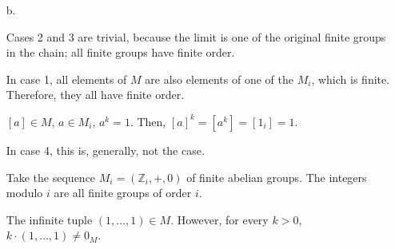 \documentclass{article}
\begin{document}
\begin{enumerate}
\begin{enumerate}
       \item[b.]

         Cases 2 and 3 are trivial, because the limit is one of the
         original finite groups in the chain; all finite groups have
         finite order.

         In case 1, all elements of $M$ are also elements of one of the
         $M_i$, which is finite. Therefore, they all have finite order.

         $[a] \in M$, $a \in M_i$, $a^k = 1$. Then, $[a]^k = \left [ a^k \right ] = \left [ 1_i \right ] = 1$.

         In case 4, this is, generally, not the case.

         Take the sequence $M_i = (\mathbb{Z}_{i},+,0)$ of finite abelian
         groups. The integers modulo ${i}$ are all finite groups of
         order $i$.

         The infinite tuple $(1, …, 1) \in M$. However, for every $k > 0$,
         $k·(1, …, 1) \neq 0_M$.
         
         
     \end{enumerate}

\end{enumerate}
\end{document}
